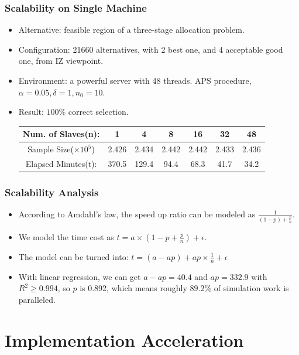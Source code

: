 \documentclass{beamer}
\begin{document}
\begin{frame}
\frametitle{Scalability on Single Machine}
\begin{itemize}
\item {Alternative: } feasible region of a three-stage allocation problem.
\item {Configuration: } 21660 alternatives, with 2 best one, and 4 acceptable good one, from IZ viewpoint.
\item {Environment: } a powerful server with 48 threads. APS procedure, $\alpha=0.05, \delta=1, n_0 = 10$.
\item {Result: } $100\%$ correct selection.
\begin{table}[ht]
\begin{center}
\scalebox{0.85}
{
\begin{tabular}{|c|c|c|c|c|c|c|}
\hline
Num. of Slaves(n): & 1 & 4 & 8 & 16 & 32 & 48 \\
\hline
Sample Size($\times 10^5$) & 2.426 & 2.434 & 2.442 & 2.442 & 2.433 & 2.436\\
\hline
Elapsed Minutes(t): & 370.5 & 129.4 & 94.4 & 68.3 & 41.7 & 34.2 \\
\hline
\end{tabular}
}
\end{center}
\end{table}
\end{itemize}
\end{frame}

\begin{frame}
\frametitle{Scalability Analysis}
\begin{itemize}
\item According to Amdahl's law, the speed up ratio can be modeled as $\frac{1}{(1 - p) + \frac{p}{n}}$.
\item We model the time cost as $ t = a \times (1 - p + \frac{p}{n}) + \epsilon $.
\item The model can be turned into: $ t = (a - ap) + ap \times \frac{1}{n} + \epsilon $
\item With linear regression, we can get $a - ap = 40.4$ and $ap = 332.9$ with $R^2 \geqslant 0.994$, so $p$ is 0.892, which means roughly $89.2\%$ of simulation work is paralleled.
\end{itemize}
\end{frame}

\section{Implementation Acceleration}
\end{document}
